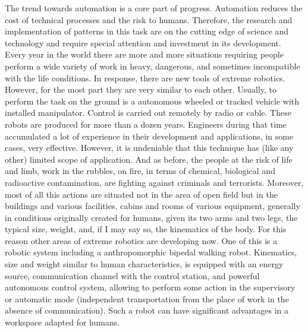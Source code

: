 \documentclass[11pt,a4paper]{report}
\begin{document}
The trend towards automation is a core part of progress. Automation reduces the cost of technical processes and the risk to humans. Therefore, the research and implementation of patterns in this task are on the cutting edge of science and technology and require special attention and investment in its development. Every year in the world there are more and more situations requiring people perform a wide variety of work in heavy, dangerous, and sometimes incompatible with the life conditions. In response, there are new tools of extreme robotics. However, for the most part they are very similar to each other. Usually, to perform the task on the ground is a autonomous wheeled or tracked vehicle with installed manipulator. Control is carried out remotely by radio or cable. These robots are produced for more than a dozen years. Engineers during that time accumulated a lot of experience in their development and applications, in some cases, very effective. However, it is undeniable that this technique has (like any other) limited scope of application. And as before, the people at the risk of life and limb, work in the rubbles, on fire, in terms of chemical, biological and radioactive contamination, are fighting against criminals and terrorists. Moreover, most of all this actions are situated not in the area of open field but in the buildings and various facilities, cabins and rooms of various equipment,  generally in conditions originally created for humans, given its two arms and two legs, the typical size, weight, and, if I may say so, the kinematics of the body. For this reason other areas of extreme robotics are developing now. One of this is a robotic system including a anthropomorphic bipedal walking robot. Kinematics, size and weight  similar to human characteristics, is equipped with an energy source, communication channel with the control station, and powerful autonomous control system, allowing to perform some action in the supervisory or automatic mode (independent transportation from the place of work in the absence of communication). Such a robot can have significant advantages in a workspace adapted for humans.
\end{document}
